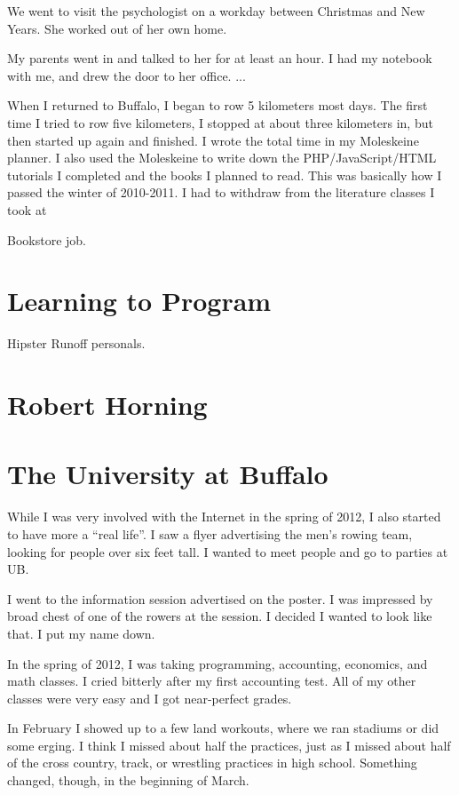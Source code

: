 \documentclass[12pt]{article}
\begin{document}
We went to visit the psychologist on a workday between Christmas and New
Years.  She worked out of her own home. 

My parents went in and talked to her for at least an hour.  I had my notebook
with me, and drew the door to her office.   ...

When I returned to Buffalo, I began to row 5 kilometers most days.  The first
time I tried to row five kilometers, I stopped at about three kilometers in, but
then started up again and finished.  I wrote the total time in my Moleskeine
planner.  I also used the Moleskeine to write down the PHP/JavaScript/HTML
tutorials I completed and the books I planned to read.  This was basically how I
passed the winter of 2010-2011.  I had to withdraw from the literature classes I
took at 

Bookstore job.  

\section{Learning to Program}
Hipster Runoff personals.

\section{Robert Horning}

\section{The University at Buffalo}
While I was very involved with the Internet in the spring of 2012, I also
started to have more a ``real life''.  I saw a flyer advertising the men's
rowing team, looking for people over six feet tall.   I wanted to
meet people and go to parties at UB. 

I went to the information session advertised on the poster.  I was impressed by
 broad chest of one of the rowers at the session.  I decided I
wanted to look like that.  I put my name down.

In the spring of 2012, I was taking programming, accounting, economics, and
math classes.  I cried bitterly after my first accounting test.  All of my
other classes were very easy and I got near-perfect grades.

In February I showed up to a few land workouts, where we ran stadiums or did
some erging.  I think I missed about half the practices, just as I missed about
half of the cross country, track, or wrestling practices in high school.
Something changed, though, in the beginning of March.
\end{document}

